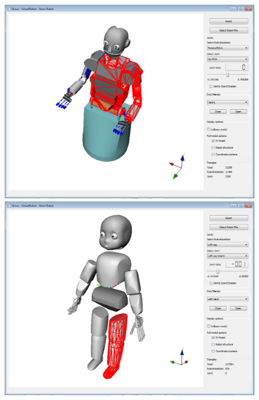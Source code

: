 \documentclass{book}
\begin{document}
\par
\begin{figure}[H]
	\centering
	\begin{minipage} {.45\linewidth}
	  \includegraphics[width=\linewidth]{Tutorial8}
	\end{minipage}
	\begin{minipage} {.45\linewidth}
	  \includegraphics[width=\linewidth]{Tutorial8b}
	\end{minipage}
\end{figure}
\par
\end{document}
